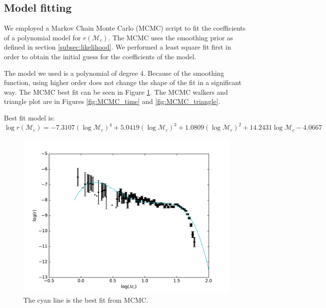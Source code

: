 \subsection{Model fitting}
\label{subsec:fitting}
We employed a Markov Chain Monte Carlo (MCMC) script to fit the coefficients of a polynomial model for $r(\mathcal{M}_c)$. The MCMC uses the smoothing prior as defined in section \ref{subsec:likelihood}. We performed a least square fit first in order to obtain the initial guess for the coefficients of the model.

The model we used is a polynomial of degree 4. Because of the smoothing function, using higher order does not change the shape of the fit in a significant way. The MCMC best fit can be seen in Figure \ref{fig:line_MCMC}. The MCMC walkers and triangle plot are in Figures \ref{fig:MCMC_time} and \ref{fig:MCMC_triangle}.

Best fit model is:
\begin{equation}
\label{MCMC_best_fit}
\log r(\mathcal{M}_c) = -7.3107 (\log\mathcal{M}_c)^4 + 5.0419 (\log\mathcal{M}_c)^3 + 1.0809 (\log\mathcal{M}_c)^2 + 14.2431 \log\mathcal{M}_c - 4.0667
\end{equation}

\begin{figure}[ht]
  \includegraphics[width=\columnwidth]{img/line-MCMC.pdf}
  \caption{The cyan line is the best fit from MCMC.}
  \label{fig:line_MCMC}
\end{figure}



